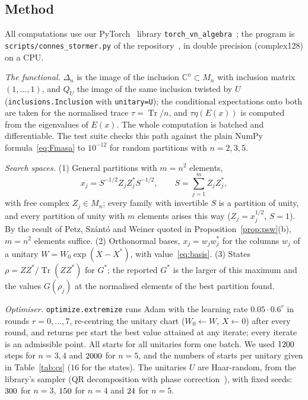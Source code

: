 \documentclass[11pt]{article}
\DeclareMathOperator{\Tr}{Tr}
\newcommand{\C}{\mathbb{C}}
\theoremstyle{plain}
\theoremstyle{definition}
\theoremstyle{remark}
\begin{document}
\subsection{Method}

All computations use our PyTorch~\cite{paszke2019} library \texttt{torch\_\allowbreak vn\_\allowbreak algebra}~\cite{lib};
the program is \texttt{scripts/\allowbreak connes\_\allowbreak stormer.py} of the repository~\cite{lib}, in double precision
(complex128) on a CPU.

\emph{The functional.} $\Delta_n$ is the image of the inclusion $\C^n\subset M_n$ with inclusion matrix $(1,\dots,1)$, and $Q_U$
the image of the same inclusion twisted by $U$ (\texttt{inclusions.Inclusion} with \texttt{unitary=U}); the conditional
expectations onto both are taken for the normalised trace $\tau=\Tr/n$, and $\tau\eta(E(x))$ is computed from the eigenvalues of
$E(x)$. The whole computation is batched and differentiable. The test suite checks this path against the plain NumPy
formula~\eqref{eq:Fmasa} to $10^{-12}$ for random partitions with $n=2,3,5$.

\emph{Search spaces.} (1) General partitions with $m=n^2$ elements,
\[
  x_j=S^{-1/2}Z_jZ_j^*S^{-1/2},\qquad S=\sum_{j=1}^mZ_jZ_j^*,
\]
with free complex $Z_j\in M_n$; every family with invertible $S$ is a partition of unity, and every partition of unity with
$m$ elements arises this way ($Z_j=x_j^{1/2}$, $S=1$). By the result of Petz, Sz\'ant\'o and Weiner quoted in
Proposition~\ref{prop:psw}(b), $m=n^2$ elements suffice. (2) Orthonormal bases, $x_j=w_jw_j^*$ for
the columns $w_j$ of a unitary $W=W_0\exp(X-X^*)$, with value~\eqref{eq:basis}. (3) States $\rho=ZZ^*/\Tr(ZZ^*)$ for $G^*$; the
reported $G^*$ is the larger of this maximum and the values $G(\rho_j)$ at the normalised elements of the best partition found.

\emph{Optimiser.} \texttt{optimize.extremize} runs Adam with the learning rate $0.05\cdot0.6^r$ in rounds $r=0,\dots,7$, re-centring
the unitary chart ($W_0\leftarrow W$, $X\leftarrow0$) after every round, and returns per start the best value attained at any
iterate; every iterate is an admissible point. All starts for all unitaries form one batch. We used $1200$ steps for
$n=3,4$ and $2000$ for $n=5$, and the numbers of starts per unitary given in Table~\ref{tab:cs} ($16$ for the states).
The unitaries $U$ are Haar-random, from the library's sampler (QR decomposition with phase correction~\cite{mezzadri2007}), with
fixed seeds: $300$ for $n=3$, $150$ for $n=4$ and $24$ for $n=5$.
\end{document}
